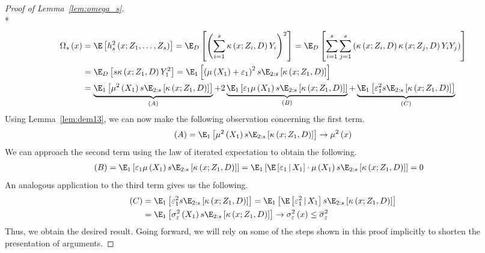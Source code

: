 \begin{proof}[Proof of Lemma~\ref{lem:omega_s}]\mbox{}\\*
	\begin{equation}
		\begin{aligned}
			\Omega_{s}\left(x\right)
			 & = \E\left[h_{s}^{2}\left(x; Z_1, \ldots,  Z_{s}\right)\right]
			= \E_{D}\left[\left(\sum_{i = 1}^{s}\kappa\left(x; Z_{i}, D\right)Y_{i}\right)^2\right]
			= \E_{D}\left[\sum_{i = 1}^{s}\sum_{j = 1}^{s}\left(\kappa\left(x; Z_{i}, D\right)\kappa\left(x; Z_{j}, D\right)Y_{i}Y_{j}\right)\right] \\
			 & = \E_{D}\left[s \kappa\left(x; Z_{1}, D\right)Y_{1}^2\right]
			= \E_{1}\left[\left(\mu\left(X_1\right) + \varepsilon_{1}\right)^2 s \E_{2:s}\left[\kappa\left(x; Z_{1}, D\right)\right]\right]                   \\
			 & = \underbrace{\E_{1}\left[\mu^2\left(X_1\right) s \E_{2:s}\left[\kappa\left(x; Z_{1}, D\right)\right]\right]}_{(A)}
			+ 2\underbrace{\E_{1}\left[\varepsilon_1\mu\left(X_1\right) s \E_{2:s}\left[\kappa\left(x; Z_{1}, D\right)\right]\right]}_{(B)}
			+ \underbrace{\E_{1}\left[\varepsilon_1^{2} s \E_{2:s}\left[\kappa\left(x; Z_{1}, D\right)\right]\right]}_{(C)}
		\end{aligned}
	\end{equation}
	Using Lemma~\ref{lem:dem13}, we can now make the following observation concerning the first term.
	\begin{equation}
		(A)
		= \E_{1}\left[\mu^2\left(X_1\right) s \E_{2:s}\left[\kappa\left(x; Z_{1}, D\right)\right]\right]
		\rightarrow \mu^2\left(x\right)
	\end{equation}
	We can approach the second term using the law of iterated expectation to obtain the following.
	\begin{equation}
		\begin{aligned}
			(B)
			 & = \E_{1}\left[\varepsilon_1\mu\left(X_1\right) s \E_{2:s}\left[\kappa\left(x; Z_{1}, D\right)\right]\right]
			= \E_{1}\left[\E\left[\varepsilon_1 \, | \, X_1 \right] \cdot \mu\left(X_1\right) s \E_{2:s}\left[\kappa\left(x; Z_{1}, D\right)\right]\right]
			= 0
		\end{aligned}
	\end{equation}
	An analogous application to the third term gives us the following.
	\begin{equation}
		\begin{aligned}
			(C)
			 & = \E_{1}\left[\varepsilon_1^{2} s \E_{2:s}\left[\kappa\left(x; Z_{1}, D\right)\right]\right]
			= \E_{1}\left[\E\left[\varepsilon_1^{2} \, | \, X_1\right] s \E_{2:s}\left[\kappa\left(x; Z_{1}, D\right)\right]\right] \\
			 & = \E_{1}\left[\sigma^2_{\varepsilon}\left(X_1\right) s \E_{2:s}\left[\kappa\left(x; Z_{1}, D\right)\right]\right]
			\rightarrow \sigma^2_{\varepsilon}\left(x\right)
			\leq \overline{\sigma}^2_{\varepsilon}
		\end{aligned}
	\end{equation}
	Thus, we obtain the desired result.
	Going forward, we will rely on some of the steps shown in this proof implicitly to shorten the presentation of arguments.
\end{proof}

